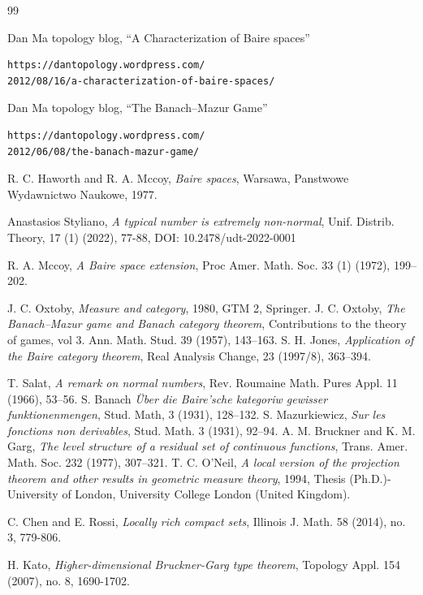 \documentclass[leqno, 12pt]{jsarticle}
\begin{document}
	
\begin{thebibliography}{99}

Dan Ma topology blog, 
``A Characterization of Baire spaces''
\begin{verbatim}
https://dantopology.wordpress.com/
2012/08/16/a-characterization-of-baire-spaces/
\end{verbatim}

Dan Ma topology blog, 
``The Banach--Mazur Game''
\begin{verbatim}
https://dantopology.wordpress.com/
2012/06/08/the-banach-mazur-game/
\end{verbatim}
R. C. Haworth and R. A. Mccoy, 
\textit{Baire spaces}, 
Warsawa, Panstwowe Wydawnictwo Naukowe, 1977. 

Anastasios Styliano, 
\textit{A typical number is extremely non-normal}, 
Unif. Distrib. Theory, 
17 (1)
(2022), 
77-88, 
DOI: 10.2478/udt-2022-0001

R. A. Mccoy, 
\textit{A Baire space extension}, 
Proc Amer. Math. Soc. 
33 (1) (1972), 
199--202. 

J. C. 
Oxtoby, \textit{Measure and category}, 
1980, 
GTM 2, Springer. 
J. C. Oxtoby, 
\textit{The Banach--Mazur game and Banach category 
theorem}, 
Contributions to the theory of games, 
vol 3.  Ann. Math. Stud. 39 (1957), 
143--163. 
S. H. Jones, 
\textit{Application of the Baire category theorem}, 
Real Analysis Change, 23 (1997/8), 363--394. 

T. Salat, 
\textit{A remark on normal numbers}, 
Rev. Roumaine Math. Pures Appl. 11 (1966), 53--56. 
S. Banach 
\textit{\"{U}ber die Baire'sche kategoriw gewisser funktionenmengen}, 
Stud. Math, 
3 (1931), 128--132.
S. Mazurkiewicz, 
\textit{Sur les fonctions non derivables}, 
 Stud. Math. 3 (1931), 
92--94. 
A. M. Bruckner and K. M. Garg, 
\textit{The level structure of a residual set of continuous functions}, 
Trans. Amer. Math. Soc. 232 (1977), 307--321. 
T. C. O'Neil, 
\textit{A local version of the projection theorem and other results in geometric measure theory}, 
1994, Thesis (Ph.D.)-University of London, University College London (United Kingdom).

C. Chen and E. Rossi, 
\textit{Locally rich compact sets}, 
Illinois J. Math. 58 (2014), no. 3, 779-806.

H. Kato, 
\textit{Higher-dimensional Bruckner-Garg type theorem}, Topology Appl. 154 (2007), no. 8, 1690-1702.
\end{thebibliography}




			
\end{document}
